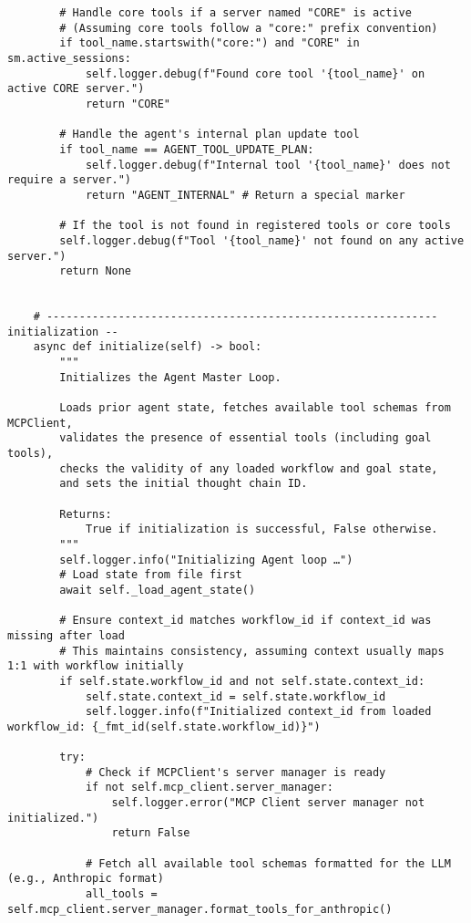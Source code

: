 \documentclass[12pt,a4paper]{article}
\begin{document}
\begin{pageablecode}
\begin{verbatim}
        # Handle core tools if a server named "CORE" is active
        # (Assuming core tools follow a "core:" prefix convention)
        if tool_name.startswith("core:") and "CORE" in sm.active_sessions:
            self.logger.debug(f"Found core tool '{tool_name}' on active CORE server.")
            return "CORE"

        # Handle the agent's internal plan update tool
        if tool_name == AGENT_TOOL_UPDATE_PLAN:
            self.logger.debug(f"Internal tool '{tool_name}' does not require a server.")
            return "AGENT_INTERNAL" # Return a special marker

        # If the tool is not found in registered tools or core tools
        self.logger.debug(f"Tool '{tool_name}' not found on any active server.")
        return None


    # ------------------------------------------------------------ initialization --
    async def initialize(self) -> bool:
        """
        Initializes the Agent Master Loop.

        Loads prior agent state, fetches available tool schemas from MCPClient,
        validates the presence of essential tools (including goal tools),
        checks the validity of any loaded workflow and goal state,
        and sets the initial thought chain ID.

        Returns:
            True if initialization is successful, False otherwise.
        """
        self.logger.info("Initializing Agent loop …")
        # Load state from file first
        await self._load_agent_state()

        # Ensure context_id matches workflow_id if context_id was missing after load
        # This maintains consistency, assuming context usually maps 1:1 with workflow initially
        if self.state.workflow_id and not self.state.context_id:
            self.state.context_id = self.state.workflow_id
            self.logger.info(f"Initialized context_id from loaded workflow_id: {_fmt_id(self.state.workflow_id)}")

        try:
            # Check if MCPClient's server manager is ready
            if not self.mcp_client.server_manager:
                self.logger.error("MCP Client server manager not initialized.")
                return False

            # Fetch all available tool schemas formatted for the LLM (e.g., Anthropic format)
            all_tools = self.mcp_client.server_manager.format_tools_for_anthropic()


\end{verbatim}
\end{pageablecode}
\end{document}
